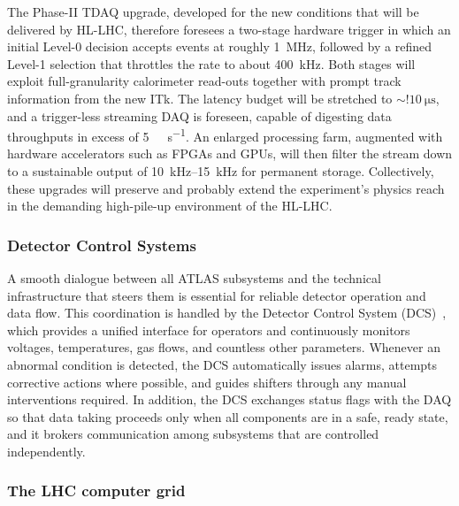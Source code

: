 The Phase-II TDAQ upgrade, developed for the new conditions that will be delivered by HL-LHC, therefore foresees a two-stage hardware trigger in which an initial Level-0 decision accepts events at roughly \SI{1}{\mega\hertz}, followed by a refined Level-1 selection that throttles the rate to about \SI{400}{\kilo\hertz}. Both stages will exploit full-granularity calorimeter read-outs together with prompt track information from the new ITk. The latency budget will be stretched to $\sim!\SI{10}{\micro\second}$, and a trigger-less streaming DAQ is foreseen, capable of digesting data throughputs in excess of \SI{5}{\tera\byte\per\second}. An enlarged processing farm, augmented with hardware accelerators such as FPGAs and GPUs, will then filter the stream down to a sustainable output of \SIrange{10}{15}{\kilo\hertz} for permanent storage. Collectively, these upgrades will preserve and probably extend the experiment’s physics reach in the demanding high-pile-up environment of the HL-LHC.

\subsubsection*{Detector Control Systems}
A smooth dialogue between all ATLAS subsystems and the technical infrastructure that steers them is essential for reliable detector operation and data flow. This coordination is handled by the Detector Control System (DCS)~\cite{atlas_DCS}, which provides a unified interface for operators and continuously monitors voltages, temperatures, gas flows, and countless other parameters. Whenever an abnormal condition is detected, the DCS automatically issues alarms, attempts corrective actions where possible, and guides shifters through any manual interventions required. In addition, the DCS exchanges status flags with the DAQ so that data taking proceeds only when all components are in a safe, ready state, and it brokers communication among subsystems that are controlled independently.

\subsubsection*{The LHC computer grid}

